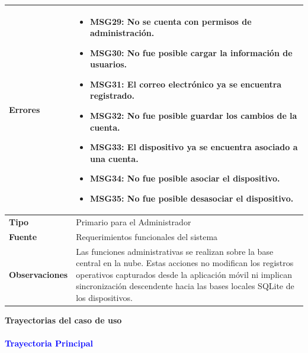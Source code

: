\begin{longtable}{|p{3.3cm}|p{10cm}|}
\textbf{Errores} & 
\begin{itemize}
    \item MSG29: No se cuenta con permisos de administración.
    \item MSG30: No fue posible cargar la información de usuarios.
    \item MSG31: El correo electrónico ya se encuentra registrado.
    \item MSG32: No fue posible guardar los cambios de la cuenta.
    \item MSG33: El dispositivo ya se encuentra asociado a una cuenta.
    \item MSG34: No fue posible asociar el dispositivo.
    \item MSG35: No fue posible desasociar el dispositivo.
\end{itemize} \\ \hline

\textbf{Tipo} & Primario para el Administrador \\ \hline

\textbf{Fuente} & Requerimientos funcionales del sistema \\ \hline

\textbf{Observaciones} & 
Las funciones administrativas se realizan sobre la base central en la nube. Estas acciones no modifican los registros operativos capturados desde la aplicación móvil ni implican sincronización descendente hacia las bases locales SQLite de los dispositivos. \\ \hline

\end{longtable}

{\large {\textbf{Trayectorias del caso de uso}}}

\vspace{0.5em}
\paragraph{\textbf{\textcolor{blue}{Trayectoria Principal}}}

